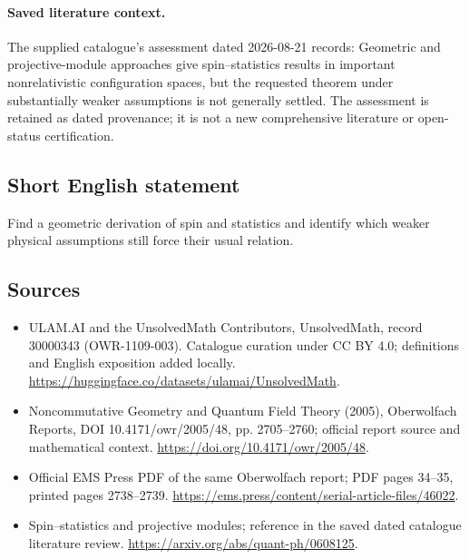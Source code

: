 \documentclass[11pt]{article}
\begin{document}
\paragraph{Saved literature context.} The supplied catalogue's assessment dated 2026-08-21 records: Geometric and projective-module approaches give spin--statistics results in important nonrelativistic configuration spaces, but the requested theorem under substantially weaker assumptions is not generally settled. The assessment is retained as dated provenance; it is not a new comprehensive literature or open-status certification.
\subsection{Short English statement}
Find a geometric derivation of spin and statistics and identify which weaker physical assumptions still force their usual relation.
\subsection{Sources}
\begin{itemize}
\item[\hypertarget{source:30000343:1}{S1}] ULAM.AI and the UnsolvedMath Contributors, UnsolvedMath, record 30000343 (OWR-1109-003). Catalogue curation under CC BY 4.0; definitions and English exposition added locally.
\url{https://huggingface.co/datasets/ulamai/UnsolvedMath}.
\item[\hypertarget{source:30000343:2}{S2}] Noncommutative Geometry and Quantum Field Theory (2005), Oberwolfach Reports, DOI 10.4171/owr/2005/48, pp. 2705--2760; official report source and mathematical context.
\url{https://doi.org/10.4171/owr/2005/48}.
\item[\hypertarget{source:30000343:3}{S3}] Official EMS Press PDF of the same Oberwolfach report; PDF pages 34--35, printed pages 2738--2739.
\url{https://ems.press/content/serial-article-files/46022}.
\item[\hypertarget{source:30000343:4}{S4}] Spin--statistics and projective modules; reference in the saved dated catalogue literature review.
\url{https://arxiv.org/abs/quant-ph/0608125}.
\end{itemize}
\label{end:30000343}
\end{document}
